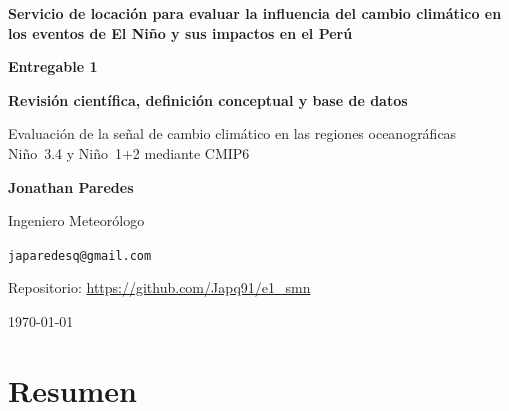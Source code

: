\documentclass[11pt,a4paper]{article}
\newcommand{\archivo}[1]{\begingroup\hypersetup{urlcolor=black}\url{#1}\endgroup}
\begin{document}

\begin{titlepage}
\centering
\vspace*{4cm}

{\LARGE \bfseries Servicio de locación para evaluar la influencia del cambio climático en los eventos de El Niño y sus impactos en el Perú \par}

\vspace{4cm}

{\LARGE \bfseries Entregable 1 \par}
\vspace{0.5cm}
{\LARGE \bfseries Revisi\'on cient\'ifica, definici\'on conceptual y base de datos \par}
\vspace{0.3cm}

{\large Evaluaci\'on de la se\~nal de cambio clim\'atico en las regiones oceanogr\'aficas Ni\~no~3.4 y Ni\~no~1+2 mediante CMIP6 \par}

\vspace{5cm}

{\Large \textbf{Jonathan Paredes} \par}
{\large Ingeniero Meteor\'ologo \par}
{\normalsize \texttt{japaredesq@gmail.com} \par}

\vspace{0.5cm}

{\normalsize Repositorio: \archivo{https://github.com/Japq91/e1_smn} \par}

\vfill
{\normalsize \today \par}
\end{titlepage}

\tableofcontents
\clearpage
\listoffigures
\listoftables
\clearpage

\section{Resumen}
\end{document}
